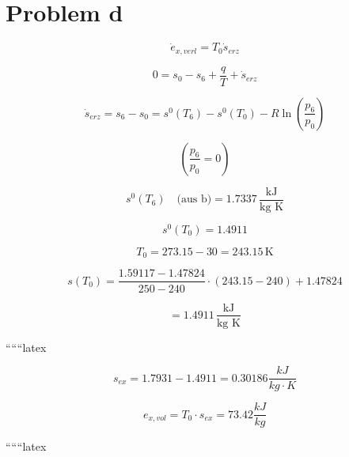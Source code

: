 \section*{Problem d}

\[
\dot{e}_{x,verl} = T_0 \dot{s}_{erz}
\]


\[
0 = s_0 - s_6 + \frac{q}{T} + \dot{s}_{erz}
\]

\[
\dot{s}_{erz} = s_6 - s_0 = s^0(T_6) - s^0(T_0) - R \ln \left( \frac{p_6}{p_0} \right)
\]

\[
\left( \frac{p_6}{p_0} = 0 \right)
\]

\[
s^0(T_6) \quad \text{(aus b)} = 1.7337 \, \frac{\text{kJ}}{\text{kg K}}
\]

\[
s^0(T_0) = 1.4911
\]

\[
T_0 = 273.15 - 30 = 243.15 \, \text{K}
\]


\[
s(T_0) = \frac{1.59117 - 1.47824}{250 - 240} \cdot (243.15 - 240) + 1.47824
\]

\[
= 1.4911 \, \frac{\text{kJ}}{\text{kg K}}
\]

``````latex

\[
s_{ex} = 1.7931 - 1.4911 = 0.30186 \frac{kJ}{kg \cdot K}
\]

\[
e_{x, vol} = T_0 \cdot s_{ex} = 73.42 \frac{kJ}{kg}
\]

``````latex